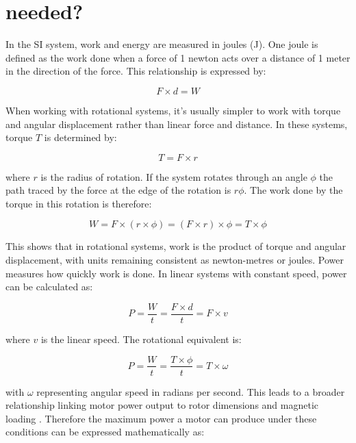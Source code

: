 \chapter{needed?}

In the SI system, work and energy are measured in joules (J). One joule is defined as the work done when a force of 1 newton acts over a distance of 1 meter in the direction of the force. This relationship is expressed by:

\begin{equation}
	F\times d = W   
	\label{eq:Work}
\end{equation} 

When working with rotational systems, it’s usually simpler to work with torque and angular displacement rather than linear force and distance. In these systems, torque $T$ is determined by:

\begin{equation}
	T = F\times r   
	\label{eq:torqueRot}
\end{equation} 

where $r$ is the radius of rotation. If the system rotates through an angle $\phi$ the path traced by the force at the edge of the rotation is $r\phi$. The work done by the torque in this rotation is therefore:

\begin{equation}
	W = F\times (r\times \phi) = (F\times r)\times \phi = T\times \phi   
	\label{eq:WorkTorque}
\end{equation}

This shows that in rotational systems, work is the product of torque and angular displacement, with units remaining consistent as newton-metres or joules. Power measures how quickly work is done. In linear systems with constant speed, power can be calculated as:

\begin{equation}
	P = \frac{W}{t} = \frac{F\times d}{t} = F\times v
	\label{eq:PowerLin}
\end{equation}

where $v$ is the linear speed. The rotational equivalent is:

\begin{equation}
	P = \frac{W}{t} = \frac{T\times \phi}{t} = T\times \omega
	\label{eq:PowerRot}
\end{equation}

with $\omega$ representing angular speed in radians per second. This leads to a broader relationship linking motor power output to rotor dimensions and magnetic loading \cite[see][23-25]{Hughes:2006}. Therefore the maximum power a motor can produce under these conditions can be expressed mathematically as:

